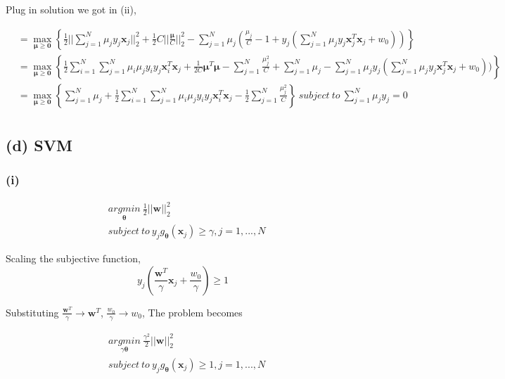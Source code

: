 \documentclass[11pt]{article}
\begin{document}
Plug in solution we got in (ii),

\begin{equation}
\begin{split}
&=\max_{\pmb{\mu}\ge\pmb{0}}\left\{\frac{1}{2}||\sum_{j=1}^{N}\mu_jy_j\pmb{x}_j||^2_2 + \frac{1}{2}C||\frac{\pmb{\mu}}{C}||^2_2 - \sum_{j=1}^{N}\mu_j(\frac{\mu_j}{C}-1+y_j(\sum_{j=1}^{N}\mu_jy_j\pmb{x}_j^T\pmb{x}_j+w_0))\right\}\\
&=\max_{\pmb{\mu}\ge\pmb{0}}\left\{\frac{1}{2}\sum_{i=1}^{N}\sum_{j=1}^{N}\mu_i\mu_jy_iy_j\pmb{x}_i^T\pmb{x}_j + \frac{1}{2C}\pmb{\mu}^T\pmb{\mu} - \sum_{j=1}^{N}\frac{\mu^2_j}{C}+\sum_{j=1}^{N}\mu_j-\sum_{j=1}^{N}\mu_jy_j(\sum_{j=1}^{N}\mu_jy_j\pmb{x}_j^T\pmb{x}_j+w_0))\right\}\\
&=\max_{\pmb{\mu}\ge\pmb{0}}\left\{\sum_{j=1}^{N}\mu_j+\frac{1}{2}\sum_{i=1}^{N}\sum_{j=1}^{N}\mu_i\mu_jy_iy_j\pmb{x}_i^T\pmb{x}_j-\frac{1}{2}\sum_{j=1}^{N}\frac{\mu^2_j}{C}\right\}\ subject\ to\ \sum_{j=1}^{N}\mu_jy_j = 0\\
\end{split}
\end{equation}
\pagebreak
\subsection*{(d) SVM}
\subsubsection*{(i)}
\begin{equation}
\begin{split}
&\underset{\pmb{\theta}}{argmin}\ \frac{1}{2}||\pmb{w}||^2_2 \\
&subject\ to\ y_jg_{\pmb{\theta}}(\pmb{x}_j)\ge \gamma,j=1,...,N
\end{split}
\end{equation}

Scaling the subjective function,
$$y_j(\frac{\pmb{w}^T}{\gamma}\pmb{x}_j+\frac{w_0}{\gamma}) \ge 1$$

Substituting $\frac{\pmb{w}^T}{\gamma}\rightarrow \pmb{w}^T$, $\frac{w_0}{\gamma}\rightarrow w_0$, The problem becomes

\begin{equation}
\begin{split}
&\underset{\gamma\pmb{\theta}}{argmin}\ \frac{\gamma^2}{2}||\pmb{w}||^2_2 \\
&subject\ to\ y_jg_{\pmb{\theta}}(\pmb{x}_j)\ge 1,j=1,...,N
\end{split}
\end{equation}
\end{document}
